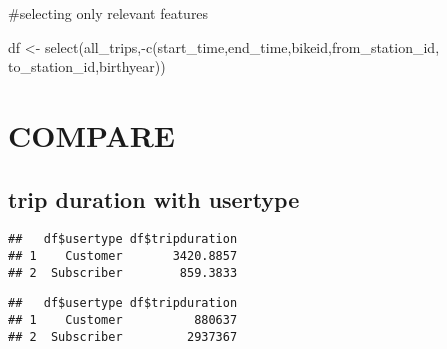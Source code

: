 \documentclass[
]{article}
\newenvironment{Shaded}{\begin{snugshade}}{\end{snugshade}}
\newcommand{\AttributeTok}[1]{\textcolor[rgb]{0.77,0.63,0.00}{#1}}
\newcommand{\FunctionTok}[1]{\textcolor[rgb]{0.00,0.00,0.00}{#1}}
\newcommand{\NormalTok}[1]{#1}
\newcommand{\OtherTok}[1]{\textcolor[rgb]{0.56,0.35,0.01}{#1}}
\newcommand{\SpecialCharTok}[1]{\textcolor[rgb]{0.00,0.00,0.00}{#1}}
\begin{document}
\#selecting only relevant features

\begin{Shaded}
\begin{Highlighting}[]
\NormalTok{df }\OtherTok{\textless{}{-}} \FunctionTok{select}\NormalTok{(all\_trips,}\SpecialCharTok{{-}}\FunctionTok{c}\NormalTok{(start\_time,end\_time,bikeid,from\_station\_id,}
\NormalTok{                          to\_station\_id,birthyear))}
\end{Highlighting}
\end{Shaded}

\hypertarget{compare}{%
\section{COMPARE}\label{compare}}

\hypertarget{trip-duration-with-usertype}{%
\subsection{trip duration with
usertype}\label{trip-duration-with-usertype}}

\begin{Shaded}
\end{Shaded}

\begin{verbatim}
##   df$usertype df$tripduration
## 1    Customer       3420.8857
## 2  Subscriber        859.3833
\end{verbatim}

\begin{Shaded}
\end{Shaded}

\begin{verbatim}
##   df$usertype df$tripduration
## 1    Customer          880637
## 2  Subscriber         2937367
\end{verbatim}
\end{document}
